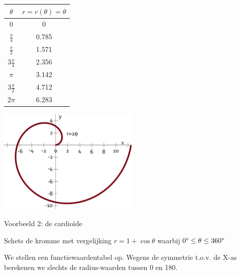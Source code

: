 \begin{minipage}{.48\linewidth}
	\centering
	\begin{tabular}{|c|c|}
		\hline 
		$\theta$ & $r=r(\theta)=\theta$\\
		\hline 
		\hline 
		$0$ & 0\\
		\hline 
		$\frac{\pi}{4}$ & 0.785 \\
		\hline 
		$\frac{\pi}{2}$ & 1.571\\
		\hline 
		$3\frac{\pi}{4}$ & 2.356\\
		\hline 
		$\pi$ & 3.142\\
		\hline 
		$3\frac{\pi}{2}$ & 4.712\\
		\hline 
		$2\pi$ & 6.283\\
		\hline 
	\end{tabular}
\end{minipage}
\begin{minipage}{.48\linewidth}
\includegraphics[height=5cm]{2_elem_rekenvaardigheden_B/inputs/figuur8}
\end{minipage}

Voorbeeld 2: de cardio\"ide

Schets de kromme met vergelijking $r=1+\cos\theta$ waarbij $0\text{\textdegree}\leq\theta\leq360\text{\textdegree}$

We stellen een functiewaardentabel op. Wegens de symmetrie t.o.v.
de X-as berekenen we slechts de radius-waarden tussen 0\textdegree{}
en 180\textdegree .

